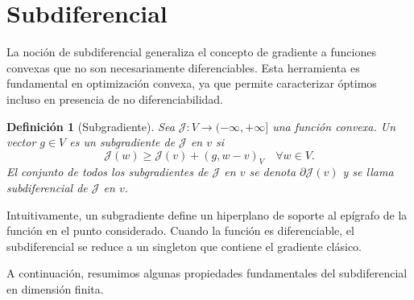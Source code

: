 \documentclass[12pt]{book}
\newtheorem{definition}{Definición}
\theoremstyle{definition}
\theoremstyle{plain}
\theoremstyle{remark}
\begin{document}

\section{Subdiferencial}


La noción de subdiferencial generaliza el concepto de gradiente a funciones convexas que no son necesariamente diferenciables. Esta herramienta es fundamental en optimización convexa, ya que permite caracterizar óptimos incluso en presencia de no diferenciabilidad.

\begin{definition}[Subgradiente]
Sea \( \mathcal{J}: V \to (-\infty, +\infty] \) una función convexa. Un vector \( g \in V \) es un \emph{subgradiente} de \( \mathcal{J} \) en \( v \) si
\[
\mathcal{J}(w) 
\geq \mathcal{J}(v) + 
(g, w - v)_V
\quad \forall w \in V.  %
\]
El conjunto de todos los subgradientes de \( \mathcal{J} \) en \( v \) se denota \( \partial \mathcal{J}(v) \) y se llama \emph{subdiferencial} de \( \mathcal{J} \) en \( v \).
\end{definition}

Intuitivamente, un subgradiente define un hiperplano de soporte al epígrafo de la función en el punto considerado. Cuando la función es diferenciable, el subdiferencial se reduce a un singleton que contiene el gradiente clásico.

A continuación, resumimos algunas propiedades fundamentales del subdiferencial en dimensión finita.

%
\end{document}
